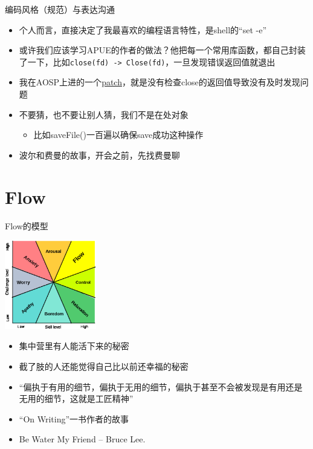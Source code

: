 \documentclass[presentation,dvipdfmx,CJKbookmarks]{beamer}
\begin{document}
\begin{CJK*}{UTF8}{simsun}
\begin{frame}[fragile,label={sec:org36d8634}]{编码风格（规范）与表达沟通}
\begin{itemize}
\begin{itemize}
\item 个人而言，直接决定了我最喜欢的编程语言特性，是\thinspace shell\thinspace 的“set -e”
\item 或许我们应该学习\thinspace APUE\thinspace 的作者的做法？他把每一个常用库函数，都自己封装了一下，比如\thinspace \texttt{close(fd) -> Close(fd)}，一旦发现错误返回值就退出
\item 我在\thinspace AOSP\thinspace 上进的一个\thinspace \href{https://android.googlesource.com/platform/frameworks/av/+/5225ba0\%255E\%2521/\#F1}{patch}，就是没有检查\thinspace close\thinspace 的返回值导致没有及时发现问题
\item 不要猜，也不要让别人猜，我们不是在处对象
\begin{itemize}
\item 比如\thinspace saveFile()\thinspace 一百遍以确保\thinspace save\thinspace 成功这种操作
\end{itemize}
\item 波尔和费曼的故事，开会之前，先找费曼聊
\end{itemize}
\end{itemize}
\end{frame}

\section{Flow}
\label{sec:orgb965e9d}

\begin{frame}[label={sec:org395dbe6}]{}
\begin{block}{Flow\thinspace 的模型}
\begin{center}
\includegraphics[width=4cm]{./images/flow.ps}
\end{center}

\begin{itemize}
\item 集中营里有人能活下来的秘密
\item 截了肢的人还能觉得自己比以前还幸福的秘密
\item “偏执于有用的细节，偏执于无用的细节，偏执于甚至不会被发现是有用还是无用的细节，这就是工匠精神”
\item “On Writing”一书作者的故事
\item Be Water My Friend -- Bruce Lee.
\end{itemize}
\end{block}
\end{frame}


\end{CJK*}
\end{document}
